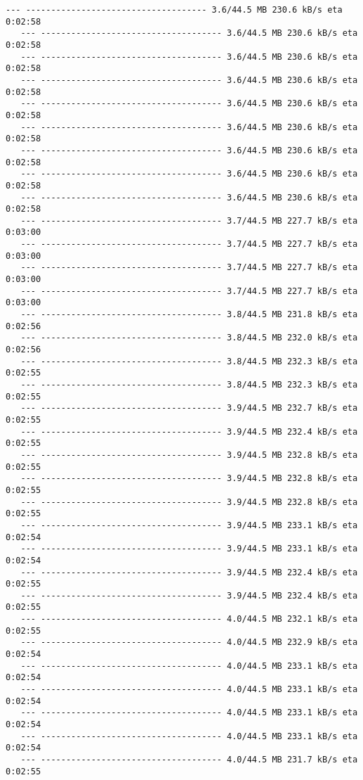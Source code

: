 \documentclass[11pt]{article}
\begin{document}
\begin{Verbatim}[commandchars=\\\{\}]
   --- ------------------------------------ 3.6/44.5 MB 230.6 kB/s eta 0:02:58
   --- ------------------------------------ 3.6/44.5 MB 230.6 kB/s eta 0:02:58
   --- ------------------------------------ 3.6/44.5 MB 230.6 kB/s eta 0:02:58
   --- ------------------------------------ 3.6/44.5 MB 230.6 kB/s eta 0:02:58
   --- ------------------------------------ 3.6/44.5 MB 230.6 kB/s eta 0:02:58
   --- ------------------------------------ 3.6/44.5 MB 230.6 kB/s eta 0:02:58
   --- ------------------------------------ 3.6/44.5 MB 230.6 kB/s eta 0:02:58
   --- ------------------------------------ 3.6/44.5 MB 230.6 kB/s eta 0:02:58
   --- ------------------------------------ 3.6/44.5 MB 230.6 kB/s eta 0:02:58
   --- ------------------------------------ 3.7/44.5 MB 227.7 kB/s eta 0:03:00
   --- ------------------------------------ 3.7/44.5 MB 227.7 kB/s eta 0:03:00
   --- ------------------------------------ 3.7/44.5 MB 227.7 kB/s eta 0:03:00
   --- ------------------------------------ 3.7/44.5 MB 227.7 kB/s eta 0:03:00
   --- ------------------------------------ 3.8/44.5 MB 231.8 kB/s eta 0:02:56
   --- ------------------------------------ 3.8/44.5 MB 232.0 kB/s eta 0:02:56
   --- ------------------------------------ 3.8/44.5 MB 232.3 kB/s eta 0:02:55
   --- ------------------------------------ 3.8/44.5 MB 232.3 kB/s eta 0:02:55
   --- ------------------------------------ 3.9/44.5 MB 232.7 kB/s eta 0:02:55
   --- ------------------------------------ 3.9/44.5 MB 232.4 kB/s eta 0:02:55
   --- ------------------------------------ 3.9/44.5 MB 232.8 kB/s eta 0:02:55
   --- ------------------------------------ 3.9/44.5 MB 232.8 kB/s eta 0:02:55
   --- ------------------------------------ 3.9/44.5 MB 232.8 kB/s eta 0:02:55
   --- ------------------------------------ 3.9/44.5 MB 233.1 kB/s eta 0:02:54
   --- ------------------------------------ 3.9/44.5 MB 233.1 kB/s eta 0:02:54
   --- ------------------------------------ 3.9/44.5 MB 232.4 kB/s eta 0:02:55
   --- ------------------------------------ 3.9/44.5 MB 232.4 kB/s eta 0:02:55
   --- ------------------------------------ 4.0/44.5 MB 232.1 kB/s eta 0:02:55
   --- ------------------------------------ 4.0/44.5 MB 232.9 kB/s eta 0:02:54
   --- ------------------------------------ 4.0/44.5 MB 233.1 kB/s eta 0:02:54
   --- ------------------------------------ 4.0/44.5 MB 233.1 kB/s eta 0:02:54
   --- ------------------------------------ 4.0/44.5 MB 233.1 kB/s eta 0:02:54
   --- ------------------------------------ 4.0/44.5 MB 233.1 kB/s eta 0:02:54
   --- ------------------------------------ 4.0/44.5 MB 231.7 kB/s eta 0:02:55

\end{Verbatim}
\end{document}
